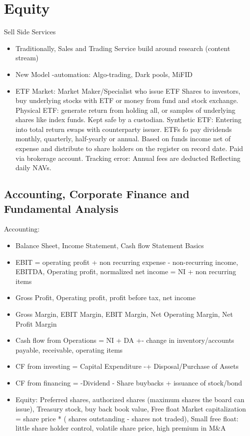 \documentclass[11pt, openany]{book}              %
\begin{document}
\section{Equity}
Sell Side Services
\begin{itemize}
    \item Traditionally, Sales and Trading Service build around research (content stream)
    \item New Model -automation: Algo-trading, Dark pools, MiFID
    \item ETF Market: Market Maker/Specialist who issue ETF Shares to investors, buy underlying stocks with ETF or money from fund and stock exchange.
    	\subitem Physical ETF: generate return from holding all, or samples of underlying shares like index funds. Kept safe by a custodian.
    	\subitem Synthetic ETF: Entering into total return swaps with counterparty issuer. 
   		\subitem ETFs fo pay dividends monthly, quarterly, half-yearly or annual. Based on funds income net of expense and distribute to share holders on the register on record date. Paid via brokerage account. 
   		\subitem Tracking error: Annual fees are deducted Reflecting daily NAVs. 
\end{itemize}

\subsection{Accounting, Corporate Finance and Fundamental Analysis}

Accounting:
\begin{itemize}
    \item Balance Sheet, Income Statement, Cash flow Statement Basics
    \item EBIT = operating profit + non recurring expense - non-recurring income, EBITDA, Operating profit, normalized net income = NI + non recurring items
    \item Gross Profit, Operating profit, profit before tax, net income
    \item Gross Margin, EBIT Margin, EBIT Margin, Net Operating Margin, Net Profit Margin 
    \item Cash flow from Operations = NI + DA +- change in inventory/accounts payable, receivable, operating items
    \item CF from investing = Capital Expenditure -+ Disposal/Purchase of Assets
    \item CF from financing = -Dividend - Share buybacks + issuance of stock/bond
    \item Equity: Preferred shares, authorized shares (maximum shares the board can issue), Treasury stock, buy back book value, Free float Market capitalization = share price * ( shares outstanding - shares not traded), Small free float: little share holder control, volatile share price, high premium in M\&A 
\end{itemize}
\end{document}
